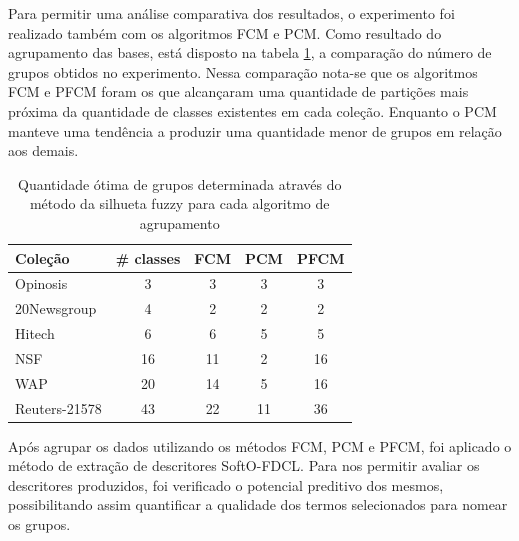 Para permitir uma análise comparativa dos resultados, o experimento foi realizado também com os
algoritmos FCM e PCM.
Como resultado do agrupamento das bases, está disposto na tabela \ref{table:pfcmclusters}, a
comparação do número de grupos obtidos no experimento. Nessa comparação nota-se que os algoritmos
FCM e PFCM foram os que alcançaram uma quantidade de partições mais próxima da quantidade de classes
existentes em cada coleção. Enquanto o PCM manteve uma tendência a produzir uma quantidade menor de
grupos em relação aos demais.

\begin{table}[!htp]
  \centering
  \begin{tabular}{ |l|c|c|c|c|}
    \hline
    {\bf Coleção} & {\bf \# classes} & {\bf FCM} & {\bf PCM} & {\bf PFCM} \\
    \hline
    Opinosis & 3 & 3 & 3 & 3 \\
    \hline
    20Newsgroup & 4 & 2 & 2 & 2 \\
    \hline
    Hitech & 6 & 6 & 5 & 5 \\
    \hline
    NSF & 16 & 11 & 2 & 16 \\
    \hline
    WAP & 20 & 14 & 5 & 16 \\
    \hline
    Reuters-21578 & 43 & 22 & 11 & 36 \\
    \hline
  \end{tabular}
  \caption{Quantidade ótima de grupos determinada através do método da silhueta fuzzy para cada
  algoritmo de agrupamento}
  \label{table:pfcmclusters}
\end{table}

Após agrupar os dados utilizando os métodos FCM, PCM e PFCM, foi aplicado o método de extração 
de descritores SoftO-FDCL. Para nos permitir avaliar os descritores produzidos, foi verificado o
potencial preditivo dos mesmos, possibilitando assim quantificar a qualidade dos
termos selecionados para nomear os grupos. 

